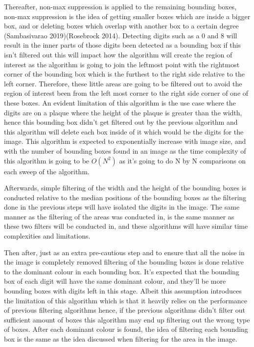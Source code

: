 \documentclass[
	12pt, %
]{fphw}
\begin{document}
Thereafter, non-max suppression is applied to the remaining bounding boxes, non-max suppression is the idea of getting smaller boxes which are inside a bigger box, and or deleting boxes which overlap with another box to a certain degree (Sambasivarao 2019)(Rosebrock 2014). Detecting digits such as a 0 and 8 will result in the inner parts of those digits been detected as a bounding box if this isn’t filtered out this will impact how the algorithm will create the region of interest as the algorithm is going to join the leftmost point with the rightmost corner of the bounding box which is the furthest to the right side relative to the left corner. Therefore, these little areas are going to be filtered out to avoid the region of interest been from the left most corner to the right side corner of one of these boxes. An evident limitation of this algorithm is the use case where the digits are on a plaque where the height of the plaque is greater than the width, hence this bounding box didn’t get filtered out by the previous algorithm and this algorithm will delete each box inside of it which would be the digits for the image. This algorithm is expected to exponentially increase with image size, and with the number of bounding boxes found in an image as the time complexity of this algorithm is going to be $O(N^2)$ as it’s going to do N by N comparisons on each sweep of the algorithm.\par

Afterwards, simple filtering of the width and the height of the bounding boxes is conducted relative to the median positions of the bounding boxes as the filtering done in the previous steps will have isolated the digits in the image. The same manner as the filtering of the areas was conducted in, is the same manner as these two filters will be conducted in, and these algorithms will have similar time complexities and limitations.\par

Then after, just as an extra pre-cautious step and to ensure that all the noise in the image is completely removed filtering of the bounding boxes is done relative to the dominant colour in each bounding box. It’s expected that the bounding box of each digit will have the same dominant colour, and they’ll be more bounding boxes with digits left in this stage. Albeit this assumption introduces the limitation of this algorithm which is that it heavily relies on the performance of previous filtering algorithms hence, if the previous algorithms didn’t filter out sufficient amount of boxes this algorithm may end up filtering out the wrong type of boxes. After each dominant colour is found, the idea of filtering each bounding box is the same as the idea discussed when filtering for the area in the image.\par
\end{document}
